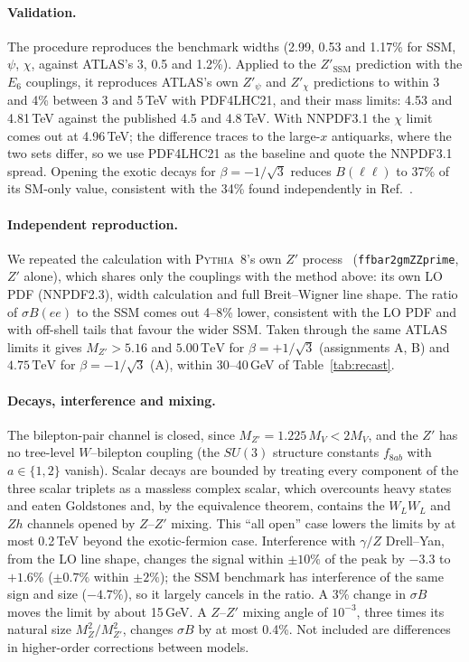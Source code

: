 \documentclass[11pt,a4paper]{article}
\newcommand{\TeV}{\,\mathrm{TeV}}
\begin{document}
\paragraph{Validation.} The procedure reproduces the benchmark widths (2.99, 0.53 and 1.17\%
for SSM, $\psi$, $\chi$, against ATLAS's 3, 0.5 and 1.2\%). Applied to the $Z'_{\text{SSM}}$
prediction with the $E_6$ couplings, it reproduces ATLAS's own $Z'_\psi$ and $Z'_\chi$
predictions to within 3 and 4\% between 3 and 5\,TeV with PDF4LHC21, and their mass
limits: 4.53 and 4.81\,TeV against the published 4.5 and 4.8\,TeV. With NNPDF3.1 the $\chi$
limit comes out at 4.96\,TeV; the difference traces to the large-$x$ antiquarks, where the
two sets differ, so we use PDF4LHC21 as the baseline and quote the NNPDF3.1 spread.
Opening the exotic decays for $\beta=-1/\sqrt3$ reduces $B(\ell\ell)$ to 37\% of its
SM-only value, consistent with the 34\% found independently in Ref.~\cite{deJesus:2020ngn}.

\paragraph{Independent reproduction.} We repeated the calculation with \textsc{Pythia}~8's
own $Z'$ process~\cite{Bierlich:2022pfr} (\texttt{ffbar2gmZZprime}, $Z'$ alone), which
shares only the couplings with the method above: its own LO PDF (NNPDF2.3), width
calculation and full Breit--Wigner line shape. The ratio of $\sigma B(ee)$ to the SSM comes
out 4--8\% lower, consistent with the LO PDF and with off-shell tails that favour the wider
SSM. Taken through the same ATLAS limits it gives $M_{Z'}>5.16$ and $5.00\TeV$ for
$\beta=+1/\sqrt3$ (assignments A, B) and $4.75\TeV$ for $\beta=-1/\sqrt3$ (A), within
30--40\,GeV of Table~\ref{tab:recast}.

\paragraph{Decays, interference and mixing.} The bilepton-pair channel is closed, since
$M_{Z'}=1.225\,M_V<2M_V$, and the $Z'$ has no tree-level $W$--bilepton coupling (the $SU(3)$
structure constants $f_{8ab}$ with $a\in\{1,2\}$ vanish). Scalar decays are bounded by
treating every component of the three scalar triplets as a massless complex scalar, which
overcounts heavy states and eaten Goldstones and, by the equivalence theorem, contains the
$W_LW_L$ and $Zh$ channels opened by $Z$--$Z'$ mixing. This ``all open'' case lowers the
limits by at most 0.2\,TeV beyond the exotic-fermion case. Interference with
$\gamma/Z$ Drell--Yan, from the LO line shape, changes the signal within $\pm10\%$ of the
peak by $-3.3$ to $+1.6\%$ ($\pm0.7\%$ within $\pm2\%$); the SSM benchmark has
interference of the same sign and size ($-4.7\%$), so it largely cancels in the ratio. A
3\% change in $\sigma B$ moves the limit by about 15\,GeV. A $Z$--$Z'$ mixing angle of
$10^{-3}$, three times its natural size $M_Z^2/M_{Z'}^2$, changes $\sigma B$ by at most
0.4\%. Not included are differences in higher-order corrections between models.
\end{document}
